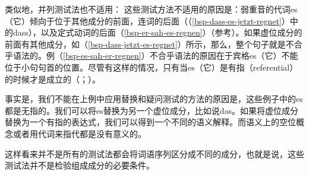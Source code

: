 \noindent
类似地，并列测试法也不适用：
\z
这些测试方法不适用的原因是：弱重音的代词es（它）倾向于位于其他成分的前面，连词的后面（（\ref{bsp-dass-es-jetzt-regnet}）中的dass），以及定式动词的后面（\ref{bsp-er-sah-es-regnen}）（参考\citet[]{Abraham95a-u}）。如果虚位成分的前面有其他成分，如（\ref{bsp-dass-jetzt-es-regnet}）所示，那么，整个句子就是不合乎语法的。例（\ref{bsp-es-sah-er-regnen}）不合乎语法的原因在于宾格es（它）不能位于小句句首的位置。尽管有这样的情况，只有当es（它）是有指（referential）的时候才是成立的（\citealt[]{Lenerz94a}；\citealp[]{GS97a}）。

事实是，我们不能在上例中应用替换和疑问测试的方法的原因是，这些例子中的es都是无指的。我们可以将es替换为另一个虚位成分，比如说das。如果将虚位成分替换为一个有指的表达式，我们可以得到一个不同的语义解释。而语义上的空位概念或者用代词来指代都是没有意义的。

这样看来并不是所有的测试法都会将词语序列区分成不同的成分，也就是说，这些测试法并不是检验组成成分的必要条件。

